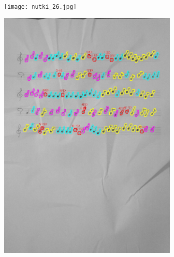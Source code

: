 \documentclass[11pt]{article}
\begin{document}
\begin{figure}[H]
    \centering
    \begin{subfigure}{.5\textwidth}
        \centering
        \graphicspath{ {Resources/} }
        \texttt{[image: nutki\_26.jpg]}
        \label{fig:sub1}
    \end{subfigure}%
    \begin{subfigure}{.5\textwidth}
        \centering
        \graphicspath{ {blobs/} }
        \includegraphics[width=\linewidth]{26_cnts.jpg}
        \label{fig:sub2}
    \end{subfigure}
    \label{fig:test}
\end{figure}
\end{document}
